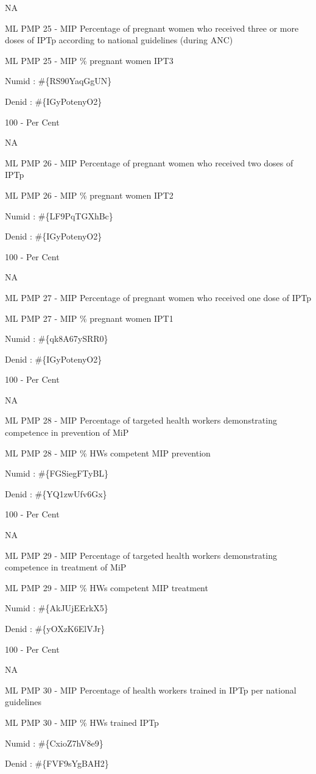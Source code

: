 \documentclass[]{book}
\begin{document}
NA

ML PMP 25 - MIP Percentage of pregnant women who received three or more doses of IPTp according to national guidelines (during ANC)

ML PMP 25 - MIP \% pregnant women IPT3

Numid : \#\{RS90YaqGgUN\}

Denid : \#\{IGyPotenyO2\}

100 - Per Cent

NA

ML PMP 26 - MIP Percentage of pregnant women who received two doses of IPTp

ML PMP 26 - MIP \% pregnant women IPT2

Numid : \#\{LF9PqTGXhBc\}

Denid : \#\{IGyPotenyO2\}

100 - Per Cent

NA

ML PMP 27 - MIP Percentage of pregnant women who received one dose of IPTp

ML PMP 27 - MIP \% pregnant women IPT1

Numid : \#\{qk8A67ySRR0\}

Denid : \#\{IGyPotenyO2\}

100 - Per Cent

NA

ML PMP 28 - MIP Percentage of targeted health workers demonstrating competence in prevention of MiP

ML PMP 28 - MIP \% HWs competent MIP prevention

Numid : \#\{FGSiegFTyBL\}

Denid : \#\{YQ1zwUfv6Gx\}

100 - Per Cent

NA

ML PMP 29 - MIP Percentage of targeted health workers demonstrating competence in treatment of MiP

ML PMP 29 - MIP \% HWs competent MIP treatment

Numid : \#\{AkJUjEErkX5\}

Denid : \#\{yOXzK6ElVJr\}

100 - Per Cent

NA

ML PMP 30 - MIP Percentage of health workers trained in IPTp per national guidelines

ML PMP 30 - MIP \% HWs trained IPTp

Numid : \#\{CxioZ7hV8e9\}

Denid : \#\{FVF9sYgBAH2\}
\end{document}
